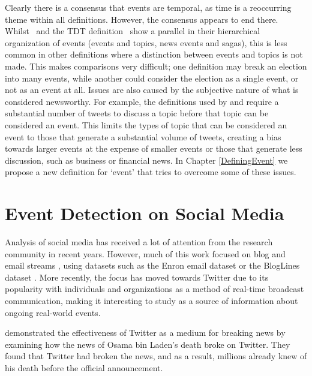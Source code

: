 Clearly there is a consensus that events are temporal, as time is a reoccurring theme within all definitions.
However, the consensus appears to end there.
Whilst~\cite{Aggarwal12} and the TDT definition~\citep{Allan:2002:ITD:772260.772262} show a parallel in their hierarchical organization of events (events and topics, news events and sagas), this is less common in other definitions where a distinction between events and topics is not made.
This makes comparisons very difficult; one definition may break an election into many events, while another could consider the election as a single event, or not as an event at all.
Issues are also caused by the subjective nature of what is considered newsworthy.
For example, the definitions used by \cite{weng2011event} and \cite{Becker_beyondtrending} require a substantial number of tweets to discuss a topic before that topic can be considered an event.
This limits the types of topic that can be considered an event to those that generate a substantial volume of tweets, creating a bias towards larger events at the expense of smaller events or those that generate less discussion, such as business or financial news. In Chapter \ref{DefiningEvent} we propose a new definition for `event' that tries to overcome some of these issues.

\section{Event Detection on Social Media}

Analysis of social media has received a lot of attention from the research community in recent years.
However, much of this work focused on blog and email streams  \citep{Zhao:2007:TIF:1619797.1619886,Jurgens:2009:EDB:1859650.1859652,Becker:2010:LSM:1718487.1718524,Nguyen:2011:ERR:2186701.2186707}, using datasets such as the Enron email dataset \citep{citeulike:7616867} or the BlogLines dataset \citep{Sia:2008:ECP:1401890.1401967}.
More recently, the focus has moved towards Twitter due to its popularity with individuals and organizations as a method of real-time broadcast communication, making it interesting to study as a source of information about ongoing real-world events.

\cite{Hu:2012:BNT:2208636.2208672} demonstrated the effectiveness of Twitter as a medium for breaking news by examining how the news of Osama bin Laden's death broke on Twitter. They found that Twitter had broken the news, and as a result, millions already knew of his death before the official announcement.

